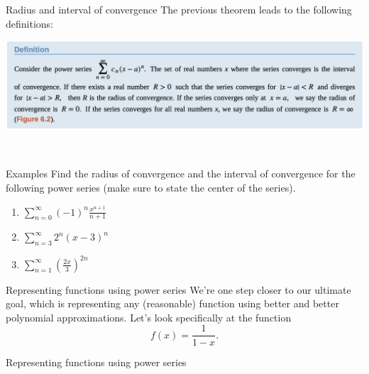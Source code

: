 \documentclass[presentation]{beamer}
\begin{document}
\begin{frame}[label={sec:org4fce166}]{Radius and interval of convergence}
The previous theorem leads to the following definitions:

\begin{center}
\begin{center}
\includegraphics[width=.9\linewidth]{../img/rofConv.png}
\end{center}\\[0pt]
\end{center}

\vspace{10in}
\end{frame}
\begin{frame}[label={sec:orgd388929}]{Examples}
Find the radius of convergence and the interval of convergence
for the following power series (make sure to state the center of the
series).

\begin{enumerate}
\item \(\sum\limits_{n=0}^{\infty} \left( -1 \right)^n
      \frac{x^{n+1}}{n+1}\)

\item \(\sum\limits_{n=3}^{\infty} 2^n \left( x-3 \right)^n\)

\item \(\sum\limits_{n=1}^{\infty} \left( \frac{2x}{3} \right)^{2n}\)
\end{enumerate}

\vspace{10in}
\end{frame}

\begin{frame}[label={sec:orgd98cf65}]{Representing functions using power series}
We're one step closer to our ultimate goal, which is representing any
(reasonable) function using better and better polynomial
approximations. Let's look specifically at the function \[f(x) =
\frac{1}{1-x}.\]
\vspace{10in}
\end{frame}
\begin{frame}[label={sec:orgc1b9fb1}]{Representing functions using power series}
\end{frame}
\end{document}
